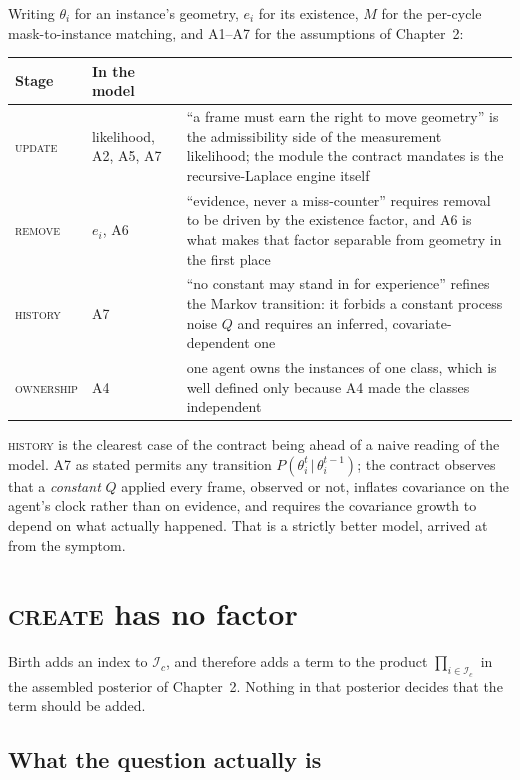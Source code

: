 \documentclass[11pt,a4paper]{report}
\newcommand{\given}{\,|\,}
\begin{document}
Writing $\theta_i$ for an instance's geometry, $e_i$ for its existence, $M$ for the per-cycle
mask-to-instance matching, and A1--A7 for the assumptions of Chapter~2:

\begin{center}
\begin{tabular}{@{}l l p{7.5cm}@{}}
\toprule
Stage & In the model & \\
\midrule
\textsc{update} & likelihood, A2, A5, A7 &
  ``a frame must earn the right to move geometry'' is the admissibility side of the measurement
  likelihood; the module the contract mandates is the recursive-Laplace engine itself \\[3pt]
\textsc{remove} & $e_i$, A6 &
  ``evidence, never a miss-counter'' requires removal to be driven by the existence factor, and A6
  is what makes that factor separable from geometry in the first place \\[3pt]
\textsc{history} & A7 &
  ``no constant may stand in for experience'' refines the Markov transition: it forbids a constant
  process noise $Q$ and requires an inferred, covariate-dependent one \\[3pt]
\textsc{ownership} & A4 &
  one agent owns the instances of one class, which is well defined only because A4 made the
  classes independent \\
\bottomrule
\end{tabular}
\end{center}

\noindent
\textsc{history} is the clearest case of the contract being ahead of a naive reading of the model.
A7 as stated permits any transition $P(\theta_i^t\given\theta_i^{t-1})$; the contract observes that
a \emph{constant} $Q$ applied every frame, observed or not, inflates covariance on the agent's
clock rather than on evidence, and requires the covariance growth to depend on what actually
happened. That is a strictly better model, arrived at from the symptom.

\section{\textsc{create} has no factor}
\label{sec:create-gap}

Birth adds an index to $\mathcal{I}_c$, and therefore adds a term to the product
$\prod_{i\in\mathcal{I}_c}$ in the assembled posterior of Chapter~2. Nothing in that posterior
decides that the term should be added.

\subsection{What the question actually is}
\end{document}
